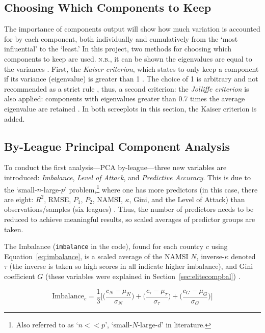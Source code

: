 \documentclass[a4paper,10pt]{report}
\begin{document}
\subsection{Choosing Which Components to Keep}
The importance of components output will show how much variation is accounted for by each component, both individually and cumulatively from the `most influential' to the `least.' In this project, two methods for choosing which components to keep are used. \textsc{n.b.}, it can be shown the eigenvalues are equal to the variances \autocite{alto19}. First, the \textit{Kaiser criterion}, which states to only keep a component if its variance (eigenvalue) is greater than 1 \autocite{kaiser74}. The choice of 1 is arbitrary and not recommended as a strict rule \autocite{fabrigar99}, thus, a second criterion: the \textit{Jolliffe criterion} is also applied: components with eigenvalues greater than 0.7 times the average eigenvalue are retained \autocite{jolliffe72}. In both screeplots in this section, the Kaiser criterion is added. 


\subsection{By-League Principal Component Analysis}\label{ssec:byleaguepca}
To conduct the first analysis---PCA by-league---three new variables are introduced: \textit{Imbalance}, \textit{Level of Attack}, and \textit{Predictive Accuracy}. This is due to the `small-$n$-large-$p$' problem,\footnote{Also referred to as `$n<<p$', `small-$N$-large-$d$' in literature.} where one has more predictors (in this case, there are eight: $R^2$, RMSE, $P_1$, $P_2$, NAMSI, $\kappa$, Gini, and the Level of Attack) than observations/samples (six leagues) \autocite{ma11}. Thus, the number of predictors needs to be reduced to achieve meaningful results, so scaled averages of predictor groups are taken.

The Imbalance (\lstinline|imbalance| in the code), found for each country $c$ using Equation~\ref{eq:imbalance}, is a scaled average of the NAMSI $N$, inverse-$\kappa$ denoted $\tau$ (the inverse is taken so high scores in all indicate higher imbalance), and Gini coefficient $G$ (these variables were explained in Section~\ref{sec:elitecompbal}) \autocite{Goossens05}.

\begin{equation}
\textrm{Imbalance}_{c} = \frac{1}{3}\bigg[
\bigg( \frac{ c_N - \mu_N }{ \sigma_N} \bigg) + 
\bigg( \frac{ c_{\tau} - \mu_{\tau} }{ \sigma_{\tau}} \bigg) + 
\bigg( \frac{ c_G - \mu_G }{ \sigma_G} \bigg)\bigg] \label{eq:imbalance}
\end{equation}
\end{document}
